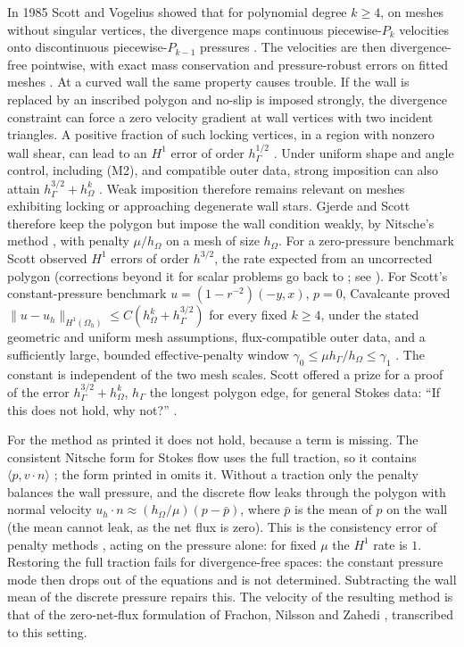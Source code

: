 \documentclass[5p,times]{elsarticle}
\theoremstyle{definition}
\newcommand{\hG}{h_\Gamma}
\newcommand{\hO}{h_\Omega}
\newcommand{\Oh}{\Omega_h}
\newcommand{\pbar}{\bar p}
\newcommand{\ip}[2]{\langle #1,#2\rangle}
\newcommand{\norm}[1]{\lVert #1\rVert}
\begin{document}
In 1985 Scott and Vogelius showed that for polynomial degree $k\ge4$, on meshes without singular vertices, the divergence maps continuous piecewise-$P_k$ velocities onto discontinuous piecewise-$P_{k-1}$ pressures \cite{ScottVogelius1985,GuzmanScott2019}. The velocities are then divergence-free pointwise, with exact mass conservation and pressure-robust errors on fitted meshes \cite{JohnEtAl2017}. At a curved wall the same property causes trouble. If the wall is replaced by an inscribed polygon and no-slip is imposed strongly, the divergence constraint can force a zero velocity gradient at wall vertices with two incident triangles. A positive fraction of such locking vertices, in a region with nonzero wall shear, can lead to an $H^1$ error of order $\hG^{1/2}$ \cite{ScottPrize,GjerdeScott2024}. Under uniform shape and angle control, including (M2), and compatible outer data, strong imposition can also attain $\hG^{3/2}+\hO^k$ \cite{PadhiExt}. Weak imposition therefore remains relevant on meshes exhibiting locking or approaching degenerate wall stars. Gjerde and Scott \cite{GjerdeScott2024} therefore keep the polygon but impose the wall condition weakly, by Nitsche's method \cite{Nitsche1971}, with penalty $\mu/\hO$ on a mesh of size $\hO$. For a zero-pressure benchmark Scott observed $H^1$ errors of order $h^{3/2}$, the rate expected from an uncorrected polygon (corrections beyond it for scalar problems go back to \cite{BrambleDupontThomee1972}; see \cite{DupontGuzmanScott2025}).
For Scott's constant-pressure benchmark $u=(1-r^{-2})(-y,x)$, $p=0$, Cavalcante proved $\norm{u-u_h}_{H^1(\Oh)}\le C(\hO^k+\hG^{3/2})$ for every fixed $k\ge4$, under the stated geometric and uniform mesh assumptions, flux-compatible outer data, and a sufficiently large, bounded effective-penalty window $\gamma_0\le\mu\hG/\hO\le\gamma_1$ \cite[Theorem~5.2]{Cavalcante2026}. The constant is independent of the two mesh scales.
 Scott offered a prize for a proof of the error $\hG^{3/2}+\hO^k$, $\hG$ the longest polygon edge, for general Stokes data: ``If this does not hold, why not?'' \cite{ScottPrize}.

For the method as printed it does not hold, because a term is missing. The consistent Nitsche form for Stokes flow uses the full traction, so it contains $\ip{p}{v\cdot n}$ \cite{BurmanHansbo2014,BurmanHansboLarson2019Stokes}; the form printed in \cite[(27)--(28)]{GjerdeScott2024} omits it. Without a traction only the penalty balances the wall pressure, and the discrete flow leaks through the polygon with normal velocity $u_h\cdot n\approx(\hO/\mu)(p-\pbar)$, where $\pbar$ is the mean of $p$ on the wall (the mean cannot leak, as the net flux is zero). This is the consistency error of penalty methods \cite{Babuska1973}, acting on the pressure alone: for fixed $\mu$ the $H^1$ rate is $1$. Restoring the full traction fails for divergence-free spaces: the constant pressure mode then drops out of the equations and is not determined. Subtracting the wall mean of the discrete pressure repairs this. The velocity of the resulting method is that of the zero-net-flux formulation of Frachon, Nilsson and Zahedi \cite[\S5.1]{FrachonNilssonZahedi2024}, transcribed to this setting.
\end{document}
